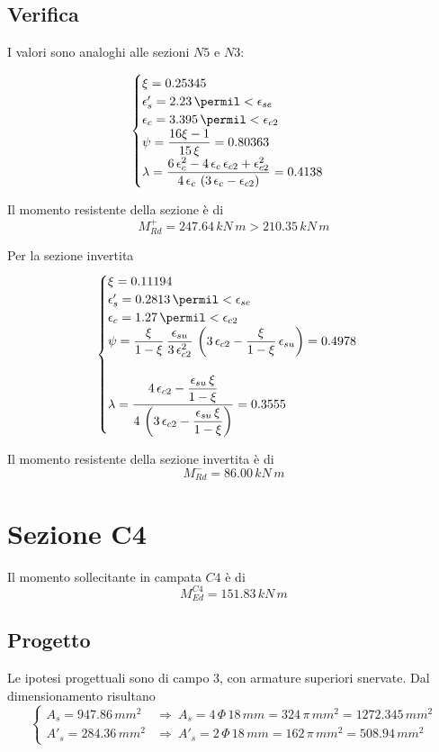 \subsection{Verifica}
I valori sono analoghi alle sezioni $N5$ e $N3$:

\[
\begin{cases}
	\xi = 0.25345\\
	\epsilon'_s = 2.23\,\permil < \epsilon_{se}\\
	\epsilon_c = 3.395\,\permil < \epsilon_{c2}\\
	\psi =\dfrac{16\xi -1}{15\,\xi} = 0.80363\\
	\lambda = \dfrac{6\,\epsilon_{c}^2 - 4\,\epsilon_{c}\,\epsilon_{c2} + \epsilon_{c2}^2}{4\,\epsilon_{c}\,\left(3\,\epsilon_c - \epsilon_{c2}\right)} = 0.4138
\end{cases}
\]

Il momento resistente della sezione è di
\[
M_{Rd}^+ = 247.64\,kN\,m > 210.35\,kN\,m
\]

Per la sezione invertita
\[
\begin{cases}
	\xi = 0.11194\\
	\epsilon'_s = 0.2813\,\permil < \epsilon_{se}\\
	\epsilon_c = 1.27\,\permil < \epsilon_{c2}\\
	\psi = \dfrac{\xi}{1-\xi}\,\dfrac{\epsilon_{su}}{3\,\epsilon_{c2}^2}\,\left(3\,\epsilon_{c2} - \dfrac{\xi}{1-\xi}\,\epsilon_{su}\right) = 0.4978\\\\
	\lambda = \dfrac{4\,\epsilon_{c2} - \dfrac{\epsilon_{su}\,\xi}{1-\xi}}{4\,\left(3\,\epsilon_{c2} - \dfrac{\epsilon_{su}\,\xi}{1-\xi}\right)} = 0.3555
\end{cases}
\]

Il momento resistente della sezione invertita è di
\[
M_{Rd}^- = 86.00\,kN\,m
\]

\section{Sezione C4}
Il momento sollecitante in campata $C4$ è di 
\[
M_{Ed}^{C4} = 151.83\,kN\,m
\]
\subsection{Progetto}
Le ipotesi progettuali sono di campo 3, con armature superiori snervate. Dal dimensionamento risultano
\[
\begin{cases}
	A_s = 947.86\,mm^2 &\Longrightarrow~A_s = 4\,\Phi\,18\,mm = 324\,\pi\,mm^2 = 1272.345\,mm^2\\
	A'_s = 284.36\,mm^2 &\Longrightarrow~ A'_s = 2\,\Phi\,18\,mm = 162\,\pi\,mm^2 = 508.94\,mm^2
\end{cases}
\]

